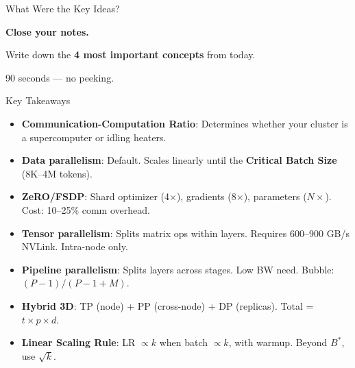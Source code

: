 \documentclass[aspectratio=169, 12pt]{beamer}
\begin{document}
\begin{frame}{What Were the Key Ideas?}

\centering
\vspace{1.5cm}
{\Large\bfseries Close your notes.}

\vspace{0.8cm}
{\large Write down the \textbf{4 most important concepts} from today.}

\vspace{0.8cm}
{\normalsize\textcolor{midgray}{90 seconds --- no peeking.}}

\end{frame}

\begin{frame}{Key Takeaways}

\scriptsize
\begin{itemize}\setlength\itemsep{0pt}
  \item \textbf{Communication-Computation Ratio}: Determines whether your cluster is a supercomputer or idling heaters.
  \item \textbf{Data parallelism}: Default. Scales linearly until the \textbf{Critical Batch Size} (8K--4M tokens).
  \item \textbf{ZeRO/FSDP}: Shard optimizer (4$\times$), gradients (8$\times$), parameters ($N\times$). Cost: 10--25\% comm overhead.
  \item \textbf{Tensor parallelism}: Splits matrix ops within layers. Requires 600--900 GB/s NVLink. Intra-node only.
  \item \textbf{Pipeline parallelism}: Splits layers across stages. Low BW need. Bubble: $(P\!-\!1)/(P\!-\!1\!+\!M)$.
  \item \textbf{Hybrid 3D}: TP (node) + PP (cross-node) + DP (replicas). Total = $t \times p \times d$.
  \item \textbf{Linear Scaling Rule}: LR $\propto k$ when batch $\propto k$, with warmup. Beyond $B^*$, use $\sqrt{k}$.
\end{itemize}

\end{frame}
\end{document}
